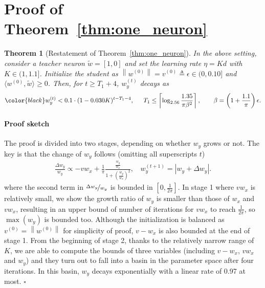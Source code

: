 \documentclass{article}
\theoremstyle{plain}
\newtheorem{theorem}{Theorem}
\theoremstyle{remark}
\newenvironment{sketch}{\paragraph{Proof sketch}}{\hfill$\square$}
\newcommand{\red}[1]{{\color{black}#1}}
\newcommand{\norm}[1]{\left\lVert#1\right\rVert}
\newcommand{\inprod}[2]{\langle #1,#2 \rangle}
\newcommand{\T}[1]{^{(#1)}}
\def\tt{^{(t+1)}}
\newcommand{\fix}[1]{\noindent{\color{blue}{#1}}}
\begin{document}
\section{Proof of Theorem~\ref{thm:one_neuron}}
\label{app:one_neuron}

\begin{theorem}[Restatement of Theorem~\ref{thm:one_neuron}]
In the above setting, consider a teacher neuron $\tilde{w}=[1,0]$ and set the learning rate $\eta=Kd$ with $K\in(1,1.1]$. Initialize the student as $\norm{w^{(0)}}=v^{(0)}\triangleq \epsilon\in(0,0.10]$ and $\inprod{w^{(0)}}{ \tilde{w}}\ge0$. Then, for $t\ge T_1 + 4$, $w_y^{(t)}$ decays as 
\begin{gather*}
    \red{w_y^{(t)} < 0.1\cdot (1-0.030K)^{t-T_1-4},}
    ~~~~~
    T_1 \le \left\lceil\log_{2.56}\frac{1.35}{\pi \beta^2}\right\rceil,
    ~~~~~~
    \beta = \left(1+\frac{1.1}{\pi}\right)\epsilon.
\end{gather*}
\end{theorem}

\begin{sketch}
    The proof is divided into two stages, depending on whether $w_y$ grows or not. The key is that the change of $w_y$ follows (omitting all superscripts $t$)
    \begin{align}
        \frac{\Delta w_y}{w_y}
        \propto
        -vw_x+\frac{1}{\pi}\frac{\frac{w_y}{w_x}}{1+(\frac{w_y}{w_x})^2}, ~~~~
        w_y\tt = \left| w_y + \Delta w_y \right|.
    \end{align}
    where the second term in $\nicefrac{\Delta w_y}{w_y}$ is bounded in $[0, \frac{1}{2\pi}]$. In stage 1 where $v w_x$ is relatively small, we show the growth ratio of $w_y$ is smaller than those of $w_x$ and $vw_x$, resulting in an upper bound of number of iterations for $vw_x$ to reach $\frac{1}{2\pi}$, so $\max(w_y)$ is bounded too. Although the initialization is balanced as $v\T{0}=\norm{w\T{0}}$ for simplicity of proof, $v-w_x$ is also bounded at the end of stage 1. From the beginning of stage 2, thanks to the relatively narrow range of $K$, we are able to compute the bounds of three variables (including $v-w_x$, $vw_x$ and $w_y$) and they turn out to fall into a basin in the parameter space after four iterations. In this basin, $w_y$ decays exponentially with a linear rate of 0.97 at most.
    \end{sketch}
\end{document}
